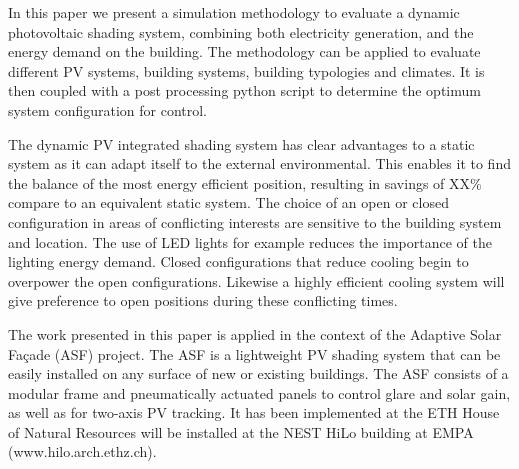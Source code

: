 
In this paper we present a simulation methodology to evaluate a dynamic photovoltaic shading system, combining both electricity generation, and the energy demand on the building. The methodology can be applied to evaluate different PV systems, building systems, building typologies and climates. It is then coupled with a post processing python script to determine the optimum system configuration for control. 

The dynamic PV integrated shading system has clear advantages to a static system as it can adapt itself to the external environmental. This enables it to find the balance of the most energy efficient position, resulting in savings of XX\% compare to an equivalent static system. The choice of an open or closed configuration in areas of conflicting interests are sensitive to the building system and location. The use of LED lights for example reduces the importance of the lighting energy demand. Closed configurations that reduce cooling begin to overpower the open configurations. Likewise a highly efficient cooling system will give preference to open positions during these conflicting times. 

The work presented in this paper is applied in the context of the Adaptive Solar Façade (ASF) project. The ASF is a lightweight PV shading system that can be easily installed on any surface of new or existing buildings. The ASF consists of a modular frame and pneumatically actuated panels to control glare and solar gain, as well as for two-axis PV tracking. It has been implemented at the ETH House of Natural Resources will be installed at the NEST HiLo building at EMPA (www.hilo.arch.ethz.ch). 